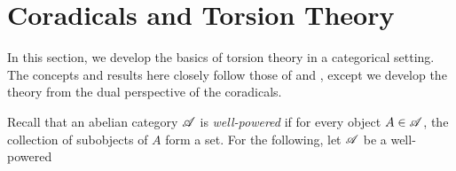 \newpage
\section{Coradicals and Torsion Theory}\label{sect_torsion_theory}

In this section, we develop the basics of torsion theory in a 
categorical setting. The concepts and results here closely follow
those of \cite{BJV} and \cite{DTor}, except we develop the theory
from the dual perspective of the coradicals. 

Recall that an abelian category $\mathscr{A}$ is \emph{well-powered} 
if for every object $A \in \mathscr{A}$, the collection of subobjects 
of $A$ form a set. For the following, let $\mathscr{A}$ be a 
well-powered

